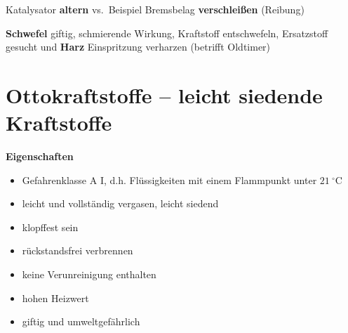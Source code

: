 Katalysator \textbf{altern} vs.~Beispiel Bremsbelag
\textbf{verschleißen} (Reibung)

\textbf{Schwefel} giftig, schmierende Wirkung, Kraftstoff entschwefeln,
Ersatzstoff gesucht und \textbf{Harz} Einspritzung verharzen (betrifft
Oldtimer)

\section{Ottokraftstoffe -- leicht siedende
Kraftstoffe}\label{ottokraftstoffe-leicht-siedende-kraftstoffe}

\textbf{Eigenschaften}

\begin{itemize}
\item
  Gefahrenklasse A I, d.h. Flüssigkeiten mit einem Flammpunkt unter
  $21~^\circ\text{C}$
\item
  leicht und vollständig vergasen, leicht siedend
\item
  klopffest sein
\item
  rückstandsfrei verbrennen
\item
  keine Verunreinigung enthalten
\item
  hohen Heizwert
\item
  giftig und umweltgefährlich
\end{itemize}


